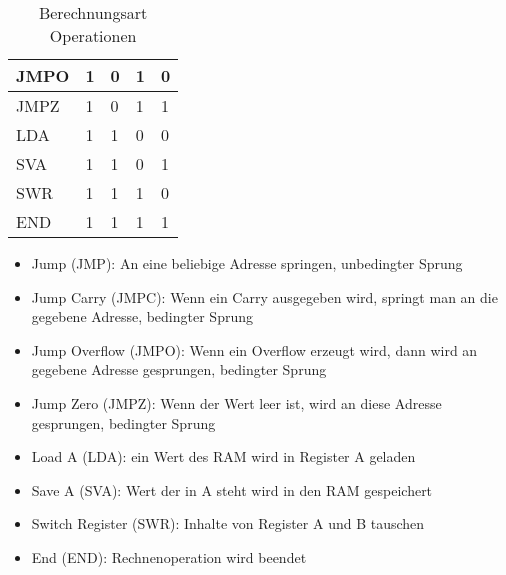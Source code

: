 \begin{table}[ht]
\begin{tabular}{| l | l | l | l| l |}
        \hline
        JMPO                                          & 1                                 & 0                                 & 1 & 0 \\
        \hline
        JMPZ                                          & 1                                 & 0                                 & 1 & 1 \\
        \hline
        LDA                                           & 1                                 & 1                                 & 0 & 0 \\
        \hline
        SVA                                           & 1                                 & 1                                 & 0 & 1 \\
        \hline
        SWR                                           & 1                                 & 1                                 & 1 & 0 \\
        \hline
        END                                           & 1                                 & 1                                 & 1 & 1 \\
        \hline
    \end{tabular}
    \caption{Berechnungsart Operationen}
    \label{tab:berechnungsart-operationen}
\end{table}

\begin{itemize}
    \item Jump (JMP): An eine beliebige Adresse springen, unbedingter Sprung
    \item Jump Carry (JMPC): Wenn ein Carry ausgegeben wird, springt man an die gegebene Adresse, bedingter Sprung
    \item Jump Overflow (JMPO): Wenn ein Overflow erzeugt wird, dann wird an gegebene Adresse gesprungen, bedingter Sprung
    \item Jump Zero (JMPZ): Wenn der Wert leer ist, wird an diese Adresse gesprungen, bedingter Sprung
    \item Load A (LDA): ein Wert des RAM wird in Register A geladen
    \item Save A (SVA): Wert der in A steht wird in den RAM gespeichert
    \item Switch Register (SWR): Inhalte von Register A und B tauschen
    \item End (END): Rechnenoperation wird beendet
\end{itemize}
